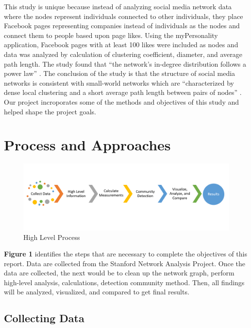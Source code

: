 \documentclass[11pt,twocolumn]{article}
\begin{document}
This study is unique because instead of analyzing social media network data where the nodes represent individuals connected to other individuals, they place Facebook pages representing companies instead of individuals as the nodes and connect them to people based upon page likes. Using the myPersonality application, Facebook pages with at least 100 likes were included as nodes and data was analyzed by calculation of clustering coefficient, diameter, and average path length. The study found that “the network’s in-degree distribution follows a power law” \cite{page-likes-facebook}. The conclusion of the study is that the structure of social media networks is consistent with small-world networks which are “characterized by dense local clustering and a short average path length between pairs of nodes” \cite{page-likes-facebook}. Our project incroporates some of the methods and objectives of this study and helped shape the project goals.

\section{Process and Approaches}

\begin{figure}[hbt!]
\includegraphics[scale=0.2]{process_flow.PNG} 
\caption{High Level Process}
\end{figure}

\textbf{Figure 1} identifies the steps that are necessary to complete the objectives of this report. Data are collected from the Stanford Network Analysis Project. Once the data are collected, the next would be to clean up the network graph, perform high-level analysis, calculations, detection community method. Then, all findings will be analyzed, visualized, and compared to get final results.

\subsection{Collecting Data}
\end{document}
